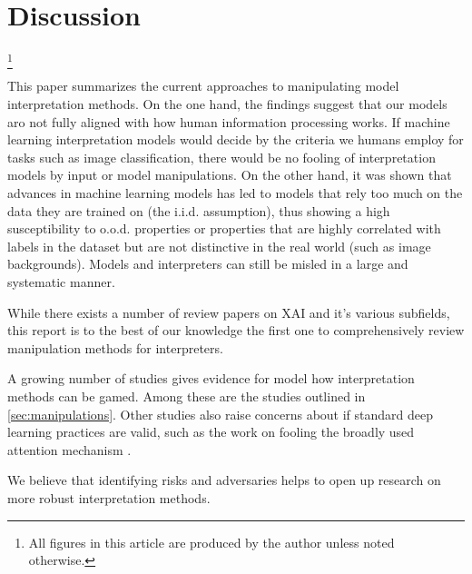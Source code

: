 \section{Discussion}
\label{sec:discussion}

\footnote{All figures in this article are produced by the author unless noted otherwise.}


This paper summarizes the current approaches to manipulating model interpretation methods. 
On the one hand, the findings suggest that our models aro not fully aligned with how human information processing works. If machine learning interpretation models would decide by the criteria we humans employ for tasks such as image classification, there would be no fooling of interpretation models by input or model manipulations. 
On the other hand, it was shown that advances in machine learning models has led to models that rely too much on the data they are trained on (the i.i.d. assumption), thus showing a high susceptibility to o.o.d. properties or properties that are highly correlated with labels in the dataset but are not distinctive in the real world (such as image backgrounds). Models and interpreters can still be misled in a large and systematic manner. 


While there exists a number of review papers on XAI and it's various subfields, this report is to the best of our knowledge the first one to comprehensively review manipulation methods for interpreters. 

A growing number of studies gives evidence for model how interpretation methods can be gamed. Among these are the studies outlined in \autoref{sec:manipulations}. Other studies also raise concerns about if standard deep learning practices are valid, such as the work on fooling the broadly used attention mechanism \cite{jain2019attention}. %

We believe that identifying risks and adversaries helps to open up research on more robust interpretation methods. 

